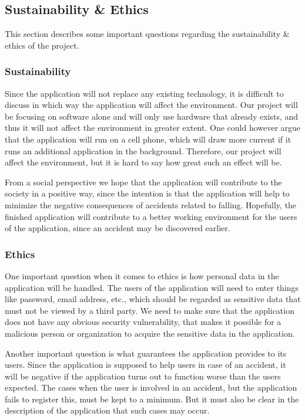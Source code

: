 \documentclass[12pt, a4paper, onecolumn]{article}
\begin{document}
		\subsection{Sustainability \& Ethics}
		
		This section describes some important questions regarding the sustainability \& ethics of the project.
		
		\subsubsection{Sustainability}
		
		Since the application will not replace any existing technology, it is difficult to discuss in which way the application will affect the environment. Our project will be focusing on software alone and will only use hardware that already exists, and thus it will not affect the environment in greater extent. One could however argue that the application will run on a cell phone, which will draw more current if it runs an additional application in the background. Therefore, our project will affect the environment, but it is hard to say how great such an effect will be.
		
		From a social perspective we hope that the application will contribute to the society in a positive way, since the intention is that the application will help to minimize the negative consequences of accidents related to falling. Hopefully, the finished application will contribute to a better working environment for the users of the application, since an accident may be discovered earlier.  
		
		\subsubsection{Ethics}
		
		One important question when it comes to ethics is how personal data in the application will be handled. The users of the application will need to enter things like password, email address, etc., which should be regarded as sensitive data that must not be viewed by a third party. We need to make sure that the application does not have any obvious security vulnerability, that makes it possible for a malicious person or organization to acquire the sensitive data in the application.
		
		Another important question is what guarantees the application provides to its users. Since the application is supposed to help users in case of an accident, it will be negative if the application turns out to function worse than the users expected. The cases when the user is involved in an accident, but the application fails to register this, must be kept to a minimum. But it must also be clear in the description of the application that such cases may occur.
		
\end{document}
